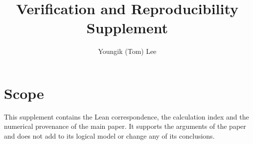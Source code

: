 \documentclass[a4paper,11pt]{article}
\title{Verification and Reproducibility Supplement}
\author{Youngik (Tom) Lee}
\begin{document}
\raggedbottom
\sloppy
\maketitle
\section*{Scope}
This supplement contains the Lean correspondence, the calculation index and
the numerical provenance of the main paper. It supports the arguments of the
paper and does not add to its logical model or change any of its conclusions.



\newpage

\end{document}
